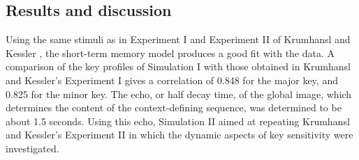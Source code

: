 \subsection{Results and discussion}
Using the same stimuli as in Experiment I and Experiment II of
Krumhansl and Kessler \cite{KrumhanslKessler:82}, the short-term
memory model produces a good fit with the data. A comparison of
the key profiles of Simulation I with those obtained in Krumhansl
and Kessler's Experiment I gives a correlation of 0.848 for the
major key, and 0.825 for the minor key. The echo, or half decay
time, of the global image, which determines the content of the
context-defining sequence, was determined to be about 1.5 seconds.
Using this echo, Simulation II aimed at repeating Krumhansl and
Kessler's Experiment II in which the dynamic aspects of key
sensitivity were investigated.

